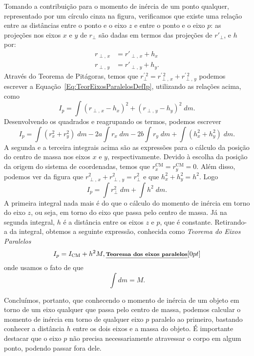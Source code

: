 Tomando a contribuição para o momento de inércia de um ponto qualquer, representado por um círculo cinza na figura, verificamos que existe uma relação entre as distâncias entre o ponto e o eixo $z$ e entre o ponto e o eixo $p$: as projeções nos eixos $x$ e $y$ de  $r_\perp$ são dadas em termos das projeções de $r'_\perp$, e $h$ por:
\begin{align}
    r_{\perp, \,x} &= r'_{\perp, \, x} + h_x \\
    r_{\perp, \,y} &= r'_{\perp, \, y} + h_y.
\end{align}
%
Através do Teorema de Pitágoras, temos que $r_\perp^{\prime \,2} = r_{\perp, \,x}^{\prime \,2} + r_{\perp, \, y}^{\prime \, 2}$ podemos escrever a Equação~\eqref{Eq:TeorEixosParalelosDefIp}, utilizando as relações acima, como
\begin{equation}
	I_p = \int (r_{\perp, \,x} - h_x)^2 + (r_{\perp, \, y} - h_y)^2 \;dm.
\end{equation}
%
Desenvolvendo os quadrados e reagrupando os termos, podemos escrever
\begin{equation}
	I_p = \int (r_x^2 + r_y^2) \;dm - 2a \int r_x \;dm - 2b \int r_y \;dm + \int (h_x^2 + h_y^2) \;dm.
\end{equation}
%
A segunda e a terceira integrais acima são as expressões para o cálculo da posição do centro de massa nos eixos $x$ e $y$, respectivamente. Devido à escolha da posição da origem do sistema de coordenadas, temos que $r_x^{\textrm{CM}} = r_y^{\textrm{CM}} = 0$. Além disso, podemos ver da figura que $r_{\perp, \, x}^2 + r_{\perp, \, y}^2 = r_\perp^2$ e que $h_x^2 + h_y^2 = h^2$. Logo
\begin{equation}
	I_p = \int r_\perp^2 \;dm + \int h^2 \;dm.
\end{equation}
%
A primeira integral nada mais é do que o cálculo do momento de inércia em torno do eixo $z$, ou seja, em torno do eixo que passa pelo centro de massa. Já na segunda integral, $h$ é a distância entre os eixos $z$ e $p$, que é constante. Retirando-a da integral, obtemos a seguinte expressão, conhecida como \emph{Teorema do Eixos Paralelos}
\begin{equation}\label{Eq:TeoremaEixosParalelos}
	I_p = I_{\textrm{CM}} + h^2 M, \relax{\footnotesize\emph{\textbf{Teorema dos eixos paralelos}}}[0pt]
\end{equation}
%
onde usamos o fato de que
\begin{equation}
	\int dm = M.
\end{equation}

Concluímos, portanto, que conhecendo o momento de inércia de um objeto em torno de um eixo qualquer que passa pelo centro de massa, podemos calcular o momento de inércia em torno de qualquer eixo $p$ paralelo ao primeiro, bastando conhecer a distância $h$ entre os dois eixos e a massa do objeto. É importante destacar que o eixo $p$ não precisa necessariamente atravessar o corpo em algum ponto, podendo passar fora dele. 

